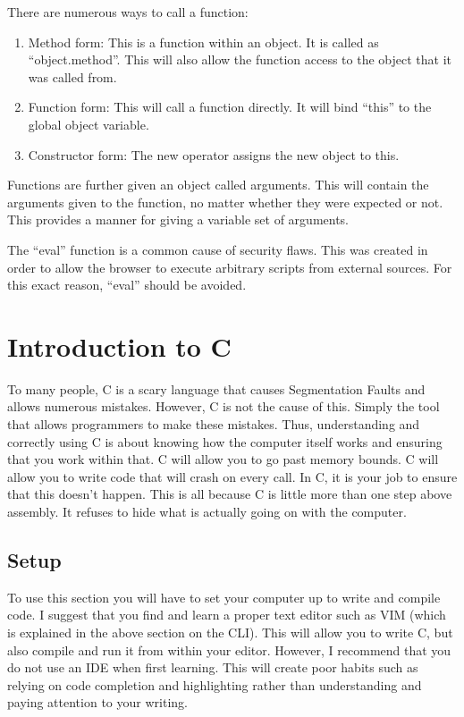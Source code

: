 			There are numerous ways to call a function:
			\begin{enumerate}
				\item Method form: This is a function within an object.
					It is called as ``object.method''.
					This will also allow the function access to the object that it was called from.
				\item Function form: This will call a function directly.
					It will bind ``this'' to the global object variable.
				\item Constructor form: The new operator assigns the new object to this.
			\end{enumerate}

			Functions are further given an object called arguments.
			This will contain the arguments given to the function, no matter whether they were expected or not.
			This provides a manner for giving a variable set of arguments.

			The ``eval'' function is a common cause of security flaws.
			This was created in order to allow the browser to execute arbitrary scripts from external sources.
			For this exact reason, ``eval'' should be avoided.
	\section{Introduction to C}
		To many people, C is a scary language that causes Segmentation Faults and allows numerous mistakes.
		However, C is not the cause of this. Simply the tool that allows programmers to make these mistakes.
		Thus, understanding and correctly using C is about knowing how the computer itself works and ensuring that you work within that.
		C will allow you to go past memory bounds.
		C will allow you to write code that will crash on every call.
		In C, it is your job to ensure that this doesn't happen.
		This is all because C is little more than one step above assembly.
		It refuses to hide what is actually going on with the computer.

		\subsection{Setup}
			To use this section you will have to set your computer up to write and compile code.
			I suggest that you find and learn a proper text editor such as VIM (which is explained in the above section on the CLI).
			This will allow you to write C, but also compile and run it from within your editor.
			However, I recommend that you do not use an IDE when first learning.
			This will create poor habits such as relying on code completion and highlighting rather than understanding and paying attention to your writing.

